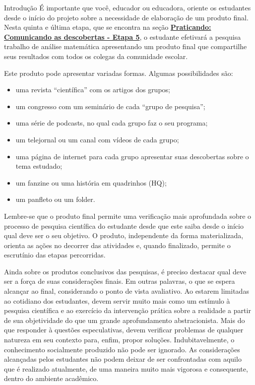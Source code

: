 \begin{apresentacao}{Introdução}
É importante que você, educador ou educadora, oriente os estudantes desde o início do projeto sobre a necessidade de elaboração de um produto final. Nesta quinta e última etapa, que se encontra na seção \hyperref[etapa5]{\textcolor{session2}{\textbf{Praticando: Comunicando as descobertas - Etapa 5}}}, o estudante efetivará a pesquisa trabalho de análise matemática apresentando um produto final que compartilhe seus resultados com todos os colegas da comunidade escolar.

Este produto pode apresentar variadas formas. Algumas possibilidades são:
\begin{itemize}
\item uma revista “científica” com os artigos dos grupos;
\item um congresso com um seminário de cada “grupo de pesquisa”;
\item uma série de podcasts, no qual cada grupo faz o seu programa;
\item um telejornal ou um canal com vídeos de cada grupo;
\item uma página de internet para cada grupo apresentar suas descobertas sobre o tema estudado;
\item um fanzine ou uma história em quadrinhos (HQ);
\item um panfleto ou um folder.
\end{itemize}

Lembre-se que o produto final permite uma verificação mais aprofundada sobre o processo de pesquisa científica do estudante desde que este saiba desde o início qual deve ser o seu objetivo. O produto, independente da forma materializada, orienta as ações no decorrer das atividades e, quando finalizado, permite o escrutínio das etapas percorridas.

Ainda sobre os produtos conclusivos das pesquisas, é preciso destacar qual deve ser a força de suas considerações finais. Em outras palavras, o que se espera alcançar ao final, considerando o ponto de vista avaliativo. Ao estarem limitadas ao cotidiano dos estudantes, devem servir muito mais como um estímulo à pesquisa científica e ao exercício da intervenção prática sobre a realidade a partir de sua objetividade do que um grande aprofundamento abstracionista. Mais do que responder à questões especulativas, devem verificar problemas de qualquer natureza em seu contexto para, enfim, propor soluções. Indubitavelmente, o conhecimento socialmente produzido não pode ser ignorado. As considerações alcançadas pelos estudantes não podem deixar de ser confrontadas com aquilo que é realizado atualmente, de uma maneira muito mais vigorosa e consequente, dentro do ambiente acadêmico.


\end{apresentacao}
